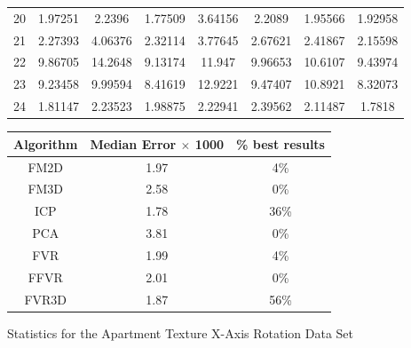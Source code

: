 \begin{figure}
\begin{tabular}{cccccccc}
20 & 1.97251 & 2.2396 & 1.77509 & 3.64156 & 2.2089 & 1.95566 & 1.92958\\
21 & 2.27393 & 4.06376 & 2.32114 & 3.77645 & 2.67621 & 2.41867 & 2.15598\\
22 & 9.86705 & 14.2648 & 9.13174 & 11.947 & 9.96653 & 10.6107 & 9.43974\\
23 & 9.23458 & 9.99594 & 8.41619 & 12.9221 & 9.47407 & 10.8921 & 8.32073\\
24 & 1.81147 & 2.23523 & 1.98875 & 2.22941 & 2.39562 & 2.11487 & 1.7818\\
\end{tabular}
\vspace{10mm}
\centering
\begin{tabular}{ccc}
\hline
\textbf{Algorithm} & \textbf{Median Error $\times$ 1000} & \textbf{\% best results}\\ \hline
FM2D	& 1.97 & 4\%\\
FM3D	& 2.58 & 0\%\\
ICP	& 1.78 & 36\%\\
PCA	& 3.81 & 0\%\\
FVR	& 1.99 & 4\%\\
FFVR	& 2.01 & 0\%\\
FVR3D	& 1.87 & 56\%\\
\end{tabular}
\caption{Statistics for the Apartment Texture X-Axis Rotation Data Set}
\label{tab:apartmenttexturex-axisrotation}
\end{figure} 


